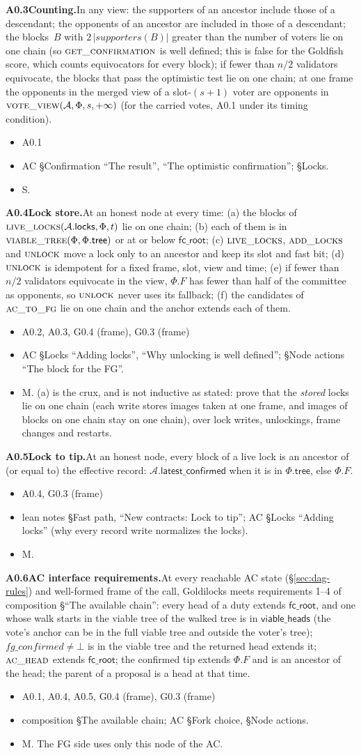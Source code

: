 \documentclass{article}
\newcommand{\AC}{\mathcal A}
\newcommand{\Fr}{\Phi}
\newcommand{\fcroot}{\mathsf{fc\_root}}
\newcommand{\allowed}{\mathsf{viable\_heads}}
\newcommand{\fname}[1]{\text{\textsc{#1}}}
\newcommand{\filtered}{\fname{viable\_tree}}
\newcommand{\latestConfirmed}{\mathsf{latest\_confirmed}}
\newcommand{\dagnode}[6]{%
\par\medskip\noindent\textbf{#1\enspace #2.}\enspace #3
\begin{itemize}[leftmargin=2.2em,itemsep=0pt,topsep=2pt]
\item[\emph{Uses}] #4
\item[\emph{Evid.}] #5
\item[\emph{Task}] #6
\end{itemize}}
\begin{document}
\dagnode{A0.3}{Counting}{In any view: the supporters of an ancestor include
those of a descendant; the opponents of an ancestor are included in those of
a descendant; the blocks~$B$ with $2\,|\mathit{supporters}(B)|$ greater than
the number of voters lie on one chain (so $\fname{get\_confirmation}$ is well
defined; this is false for the Goldfish score, which counts equivocators for
every block); if fewer than $n/2$
validators equivocate, the blocks that pass the optimistic test lie on one
chain; at one frame the opponents in the merged view of a slot-$(s+1)$ voter
are opponents in $\fname{vote\_view}(\AC,\Fr,s,+\infty)$ (for the carried
votes, A0.1 under its timing condition).}
{A0.1}{AC \S Confirmation ``The result'', ``The optimistic confirmation'';
\S Locks.}{S.}

\dagnode{A0.4}{Lock store}{At an honest node at every time:
(a) the blocks of $\fname{live\_locks}(\AC.\mathsf{locks},\Fr,t)$ lie on one
chain; (b) each of them is in $\filtered(\Fr,\Fr.\mathsf{tree})$ or at or
below $\fcroot$; (c) $\fname{live\_locks}$, $\fname{add\_locks}$ and
$\fname{unlock}$ move a lock only to an ancestor and keep its slot and fast
bit; (d) $\fname{unlock}$ is idempotent for a fixed frame, slot, view and time;
(e) if fewer than $n/2$ validators equivocate in the view, $\Fr.F$ has
fewer than half of the committee as opponents, so $\fname{unlock}$ never
uses its fallback; (f) the candidates of $\fname{ac\_to\_fg}$
lie on one chain and the anchor extends each of them.}
{A0.2, A0.3, G0.4 (frame), G0.3 (frame)}{AC \S Locks ``Adding locks'', ``Why unlocking is well
defined''; \S Node actions ``The block for the FG''.}{M.  (a) is the crux,
and is not inductive as stated: prove that the \emph{stored} locks lie on one
chain (each write stores images taken at one frame, and images of blocks on one
chain stay on one chain), over lock writes, unlockings, frame changes and
restarts.}

\dagnode{A0.5}{Lock to tip}{At an honest node, every block of a live lock is
an ancestor of (or equal to) the effective record: $\AC.\latestConfirmed$ when
it is in $\Fr.\mathsf{tree}$, else $\Fr.F$.}
{A0.4, G0.3 (frame)}{lean notes \S Fast path, ``New contracts: Lock to tip''; AC \S Locks
``Adding locks'' (why every record write normalizes the locks).}{M.}

\dagnode{A0.6}{AC interface requirements}{At every reachable AC state
(\S\ref{sec:dag-rules}) and well-formed frame of the call, Goldilocks meets
requirements 1--4 of composition \S``The available chain'':
every head of a duty extends $\fcroot$, and one whose walk starts in the
viable tree of the walked tree is in $\allowed$ (the vote's anchor can be in
the full viable tree and outside the voter's tree); $\mathit{fg\_confirmed}\neq\bot$ is in the
viable tree and the returned head extends it; $\fname{ac\_head}$ extends
$\fcroot$; the confirmed tip extends $\Fr.F$ and is an ancestor of the head;
the parent of a proposal is a head at that time.}
{A0.1, A0.4, A0.5, G0.4 (frame), G0.3 (frame)}{composition \S The available chain; AC \S Fork choice,
\S Node actions.}{M.  The FG side uses only this node of the AC.}
\end{document}
